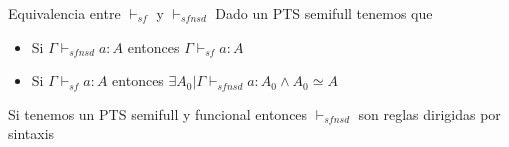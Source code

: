 \begin{lemma}{Equivalencia entre $\vdash_{sf}$ y $\vdash_{sfnsd}$}
Dado un PTS semifull tenemos que 

\begin{itemize}
    \item Si $\Gamma \vdash_{sfnsd} a : A$ entonces $\Gamma \vdash_{sf} a:A$
    \item Si $\Gamma \vdash_{sf} a : A$ entonces $\exists A_0 | \Gamma \vdash_{sfnsd} a : A_0 \land A_0 \simeq A$
    
\end{itemize}

\end{lemma}

\begin{lemma}
Si tenemos un PTS semifull y funcional entonces $\vdash_{sfnsd}$ son reglas dirigidas por sintaxis
\end{lemma}
